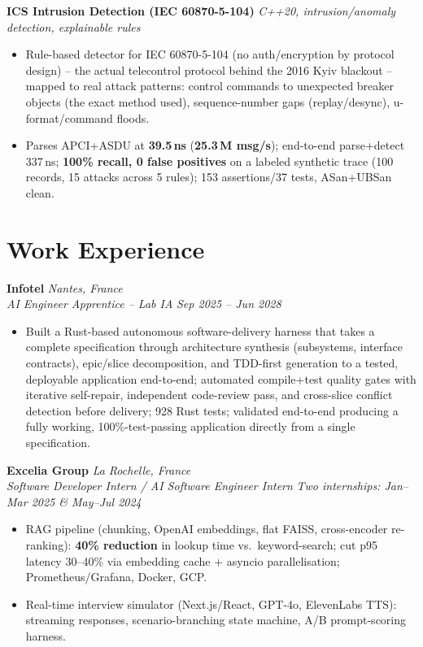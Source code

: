 \documentclass[10pt]{article}
\newcommand{\entry}[4]{%
  \noindent\textbf{#1} \hfill \textit{#2} \\
  \textit{#3} \hfill \textit{#4}\\[-0.22em]
}
\newcommand{\projectentry}[2]{%
  \noindent\textbf{#1} \hfill \textit{#2}\\[-0.3em]
}
\begin{document}
\projectentry{ICS Intrusion Detection (IEC 60870-5-104)}{C++20, intrusion/anomaly detection, explainable rules}
\begin{itemize}
  \item Rule-based detector for IEC 60870-5-104 (no auth/encryption by protocol design) -- the actual telecontrol protocol behind the 2016 Kyiv blackout -- mapped to real attack patterns: control commands to unexpected breaker objects (the exact method used), sequence-number gaps (replay/desync), u-format/command floods.
  \item Parses APCI+ASDU at \textbf{39.5\,ns} (\textbf{25.3\,M msg/s}); end-to-end parse+detect 337\,ns; \textbf{100\% recall, 0 false positives} on a labeled synthetic trace (100 records, 15 attacks across 5 rules); 153 assertions/37 tests, ASan+UBSan clean.
\end{itemize}

\section*{Work Experience}
\entry{Infotel}{Nantes, France}{AI Engineer Apprentice -- Lab IA}{Sep 2025 -- Jun 2028}
\begin{itemize}
  \item Built a Rust-based autonomous software-delivery harness that takes a complete specification through architecture synthesis (subsystems, interface contracts), epic/slice decomposition, and TDD-first generation to a tested, deployable application end-to-end; automated compile+test quality gates with iterative self-repair, independent code-review pass, and cross-slice conflict detection before delivery; 928 Rust tests; validated end-to-end producing a fully working, 100\%-test-passing application directly from a single specification.
\end{itemize}
\entry{Excelia Group}{La Rochelle, France}{Software Developer Intern / AI Software Engineer Intern}{Two internships: Jan--Mar 2025 \& May--Jul 2024}
\begin{itemize}
  \item RAG pipeline (chunking, OpenAI embeddings, flat FAISS, cross-encoder re-ranking): \textbf{40\% reduction} in lookup time vs.\ keyword-search; cut p95 latency 30--40\% via embedding cache + asyncio parallelisation; Prometheus/Grafana, Docker, GCP.
  \item Real-time interview simulator (Next.js/React, GPT-4o, ElevenLabs TTS): streaming responses, scenario-branching state machine, A/B prompt-scoring harness.
\end{itemize}
\end{document}
